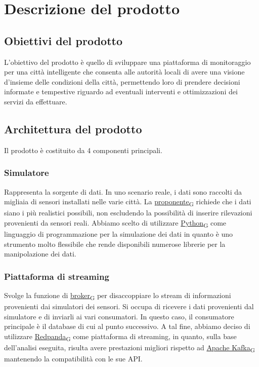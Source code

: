 \section{Descrizione del prodotto}
\subsection{Obiettivi del prodotto}
L'obiettivo del prodotto è quello di sviluppare una piattaforma di monitoraggio per una città intelligente che consenta alle autorità locali di avere una visione d'insieme delle condizioni della città, permettendo loro di prendere decisioni informate e tempestive riguardo ad eventuali interventi e ottimizzazioni dei servizi da effettuare.

\subsection{Architettura del prodotto}
Il prodotto è costituito da 4 componenti principali.
	\subsubsection*{Simulatore} 
	Rappresenta la sorgente di dati. In uno scenario reale, i dati sono raccolti da migliaia di sensori installati nelle varie città. La \href{https://7last.github.io/docs/pb/documentazione-interna/glossario\#proponente}{proponente\textsubscript{G}} richiede che i dati siano i più realistici possibili, non escludendo la possibilità di inserire rilevazioni provenienti da sensori reali. Abbiamo scelto di utilizzare \href{https://7last.github.io/docs/pb/documentazione-interna/glossario\#python}{Python\textsubscript{G}} come linguaggio di programmazione per la simulazione dei dati in quanto è uno strumento molto flessibile che rende disponibili numerose librerie per la manipolazione dei dati.
	\subsubsection*{Piattaforma di streaming}
	Svolge la funzione di \href{https://7last.github.io/docs/pb/documentazione-interna/glossario\#broker}{broker\textsubscript{G}} per disaccoppiare lo stream di informazioni provenienti dai simulatori dei sensori. Si occupa di ricevere i dati provenienti dal simulatore e di inviarli ai vari consumatori. In questo caso, il consumatore principale è il database di cui al punto successivo. A tal fine, abbiamo deciso di utilizzare \href{https://7last.github.io/docs/pb/documentazione-interna/glossario\#Redpanda}{Redpanda\textsubscript{G}} come piattaforma di streaming, in quanto, sulla base dell'analisi eseguita, risulta avere prestazioni migliori rispetto ad \href{https://7last.github.io/docs/pb/documentazione-interna/glossario\#apache-kafka}{Apache Kafka\textsubscript{G}} mantenendo la compatibilità con le sue API.
